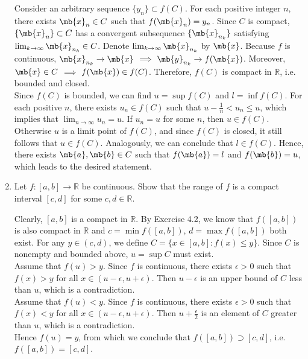 \begin{exercise}
\begin{enumerate}
			\begin{solution}
				Consider an arbitrary sequence $\{y_n\} \subset f(C)$.
				For each positive integer $n$, there exists $\mb{x}_n \in C$ such that $f(\mb{x}_n) = y_n$.
				Since $C$ is compact, $\{\mb{x}_n\} \subset C$ has a convergent subsequence $\{\mb{x}_{n_k}\}$ satisfying $\lim_{k\to\infty}\mb{x}_{n_k}\in C$.
				Denote $\lim_{k\to\infty}\mb{x}_{n_k}$ by $\mb{x}$.
				Because $f$ is continuous, $\mb{x}_{n_k} \to \mb{x}$ $\implies$ $\mb{y}_{n_k} \to f(\mb{x})$.
				Moreover, $\mb{x}\in C$ $\implies$ $f(\mb{x}) \in f(C)$.
				Therefore, $f(C)$ is compact in $\mathbb{R}$, i.e. bounded and closed.\\
				Since $f(C)$ is bounded, we can find $u = \sup f(C)$ and $l = \inf f(C)$.
				For each positive $n$, there exists $u_n \in f(C)$ such that $u - \frac{1}{n} < u_n \leq u$, which implies that $\lim_{n\to\infty}u_n = u$.
				If $u_n = u$ for some $n$, then $u\in f(C)$.
				Otherwise $u$ is a limit point of $f(C)$, and
				since $f(C)$ is closed, it still follows that $u\in f(C)$.
				Analogously, we can conclude that $l\in f(C)$.
				Hence, there exists $\mb{a}, \mb{b} \in C$ such that $f(\mb{a}) = l$ and $f(\mb{b}) = u$, which leads to the desired statement.
				\qedhere
			\end{solution}

		\item Let $f: \left[ a,b \right] \rightarrow\mathbb{R}$ be continuous. Show that the range of $f$ is a compact interval $\left[c,d \right]$ for some $c,d \in \mathbb{R}$.

			\begin{solution}
				Clearly, $[a,b]$ is a compact in $\mathbb{R}$.
				By Exercise 4.2, we know that $f([a,b])$ is also compact in $\mathbb{R}$ and $c = \min f([a,b])$, $d = \max f([a,b])$ both exist.
				For any $y\in (c,d)$, we define $C = \{x\in[a,b] : f(x)\leq y\}$.
				Since $C$ is nonempty and bounded above, $u=\sup C$ must exist. \\
				Assume that $f(u) > y$.
				Since $f$ is continuous, there exists $\epsilon > 0$ such that $f(x) > y$ for all $x\in (u-\epsilon,u+\epsilon)$.
				Then $u-\epsilon$ is an upper bound of $C$ less than $u$, which is a contradiction. \\
				Assume that $f(u) < y$.
				Since $f$ is continuous, there exists $\epsilon > 0$ such that $f(x) < y$ for all $x\in (u-\epsilon,u+\epsilon)$.
				Then $u+\frac{\epsilon}{2}$ is an element of $C$ greater than $u$, which is a contradiction.\\
				Hence $f(u) = y$, from which we conclude that $f([a,b]) \supset [c,d]$, i.e. $f([a,b]) = [c,d]$.
				\qedhere
			\end{solution}

	\end{enumerate}
\end{exercise}


